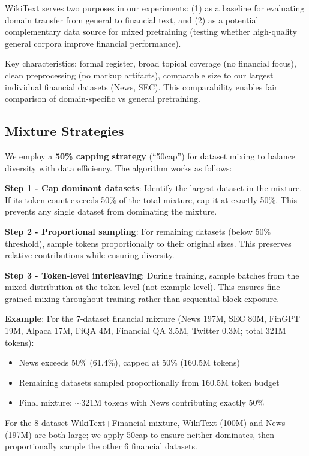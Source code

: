 WikiText serves two purposes in our experiments: (1) as a baseline for evaluating domain transfer from general to financial text, and (2) as a potential complementary data source for mixed pretraining (testing whether high-quality general corpora improve financial performance).

Key characteristics: formal register, broad topical coverage (no financial focus), clean preprocessing (no markup artifacts), comparable size to our largest individual financial datasets (News, SEC). This comparability enables fair comparison of domain-specific vs general pretraining.

\subsection{Mixture Strategies}

We employ a \textbf{50\% capping strategy} (``50cap'') for dataset mixing to balance diversity with data efficiency. The algorithm works as follows:

\textbf{Step 1 - Cap dominant datasets}: Identify the largest dataset in the mixture. If its token count exceeds 50\% of the total mixture, cap it at exactly 50\%. This prevents any single dataset from dominating the mixture.

\textbf{Step 2 - Proportional sampling}: For remaining datasets (below 50\% threshold), sample tokens proportionally to their original sizes. This preserves relative contributions while ensuring diversity.

\textbf{Step 3 - Token-level interleaving}: During training, sample batches from the mixed distribution at the token level (not example level). This ensures fine-grained mixing throughout training rather than sequential block exposure.

\textbf{Example}: For the 7-dataset financial mixture (News 197M, SEC 80M, FinGPT 19M, Alpaca 17M, FiQA 4M, Financial QA 3.5M, Twitter 0.3M; total 321M tokens):
\begin{itemize}
\item News exceeds 50\% (61.4\%), capped at 50\% (160.5M tokens)
\item Remaining datasets sampled proportionally from 160.5M token budget
\item Final mixture: $\sim$321M tokens with News contributing exactly 50\%
\end{itemize}

For the 8-dataset WikiText+Financial mixture, WikiText (100M) and News (197M) are both large; we apply 50cap to ensure neither dominates, then proportionally sample the other 6 financial datasets.

